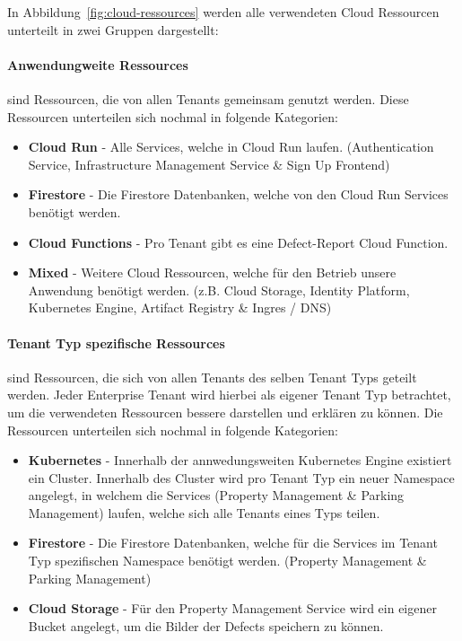 In Abbildung~\ref{fig:cloud-ressources} werden alle verwendeten Cloud Ressourcen unterteilt in zwei Gruppen dargestellt:
\paragraph{Anwendungweite Ressources} sind Ressourcen, die von allen Tenants gemeinsam genutzt werden.
Diese Ressourcen unterteilen sich nochmal in folgende Kategorien:
\begin{itemize}
	\item \textbf{Cloud Run} - Alle Services, welche in Cloud Run laufen. (Authentication Service, Infrastructure Management Service \& Sign Up Frontend)
	\item \textbf{Firestore} - Die Firestore Datenbanken, welche von den Cloud Run Services benötigt werden.
	\item \textbf{Cloud Functions} - Pro Tenant gibt es eine Defect-Report Cloud Function.
	\item \textbf{Mixed} - Weitere Cloud Ressourcen, welche für den Betrieb unsere Anwendung benötigt werden. (z.B. Cloud Storage, Identity Platform, Kubernetes Engine, Artifact Registry \& Ingres / DNS)
\end{itemize}

\paragraph{Tenant Typ spezifische Ressources} sind Ressourcen, die sich von allen Tenants des selben Tenant Typs geteilt werden.
Jeder Enterprise Tenant wird hierbei als eigener Tenant Typ betrachtet, um die verwendeten Ressourcen bessere darstellen und erklären zu können.
Die Ressourcen unterteilen sich nochmal in folgende Kategorien:
\begin{itemize}
	\item \textbf{Kubernetes} - Innerhalb der annwedungsweiten Kubernetes Engine existiert ein Cluster. Innerhalb des Cluster wird pro Tenant Typ ein neuer Namespace angelegt, in welchem die Services (Property Management \& Parking Management) laufen, welche sich alle Tenants eines Typs teilen.
	\item \textbf{Firestore} - Die Firestore Datenbanken, welche für die Services im Tenant Typ spezifischen Namespace benötigt werden. (Property Management \& Parking Management)
	\item \textbf{Cloud Storage} - Für den Property Management Service wird ein eigener Bucket angelegt, um die Bilder der Defects speichern zu können.
\end{itemize}


